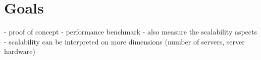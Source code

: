 \section{Goals}


- proof of concept
- performance benchmark
  - also measure the scalability aspects
  - scalability can be interpreted on more dimensions (number of servers, server hardware)




